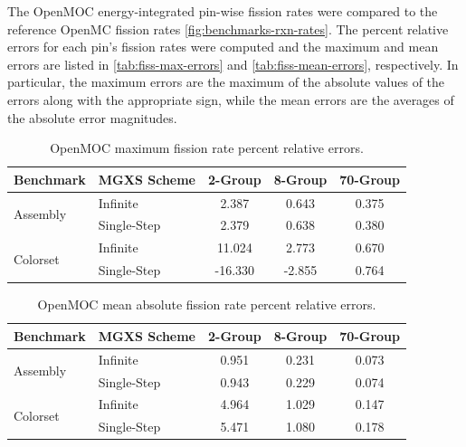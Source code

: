 The OpenMOC energy-integrated pin-wise fission rates were compared to the reference OpenMC fission rates \autoref{fig:benchmarks-rxn-rates}. The percent relative errors for each pin's fission rates were computed and the maximum and mean errors are listed in \autoref{tab:fiss-max-errors} and \autoref{tab:fiss-mean-errors}, respectively. In particular, the maximum errors are the maximum of the absolute values of the errors along with the appropriate sign, while the mean errors are the averages of the absolute error magnitudes.

\begin{table}[h!]
  \centering
  \caption{OpenMOC maximum fission rate percent relative errors.}
  \label{tab:fiss-max-errors}
  \begin{tabular}{l l c c c}
  \toprule
  \textbf{Benchmark} & \textbf{MGXS Scheme} & \textbf{2-Group} & \textbf{8-Group} & \textbf{70-Group} \\
  \midrule
  \multirow{2}{*}{Assembly} & Infinite    & 2.387 & 0.643 & 0.375 \\
                            & Single-Step & 2.379 & 0.638 & 0.380 \\
  \midrule
  \multirow{2}{*}{Colorset} & Infinite    &  11.024 &  2.773 & 0.670 \\
                            & Single-Step & -16.330 & -2.855 & 0.764 \\
  \bottomrule
\end{tabular}
\end{table}

\begin{table}[h!]
  \centering
  \caption{OpenMOC mean absolute fission rate percent relative errors.}
  \label{tab:fiss-mean-errors}
  \begin{tabular}{l l c c c}
  \toprule
  \textbf{Benchmark} & \textbf{MGXS Scheme} & \textbf{2-Group} & \textbf{8-Group} & \textbf{70-Group} \\
  \midrule
  \multirow{2}{*}{Assembly} & Infinite    & 0.951 & 0.231 & 0.073 \\
                            & Single-Step & 0.943 & 0.229 & 0.074 \\
  \midrule
  \multirow{2}{*}{Colorset} & Infinite    & 4.964 & 1.029 & 0.147 \\
                            & Single-Step & 5.471 & 1.080 & 0.178 \\
  \bottomrule
\end{tabular}
\end{table}

